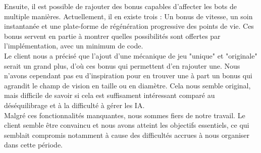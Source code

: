 Ensuite, il est possible de rajouter des bonus capables d'affecter les bots de multiple manières. Actuellement, il en existe trois : Un bonus de vitesse, un soin instantanée et une plate-forme de régénération progressive des points de vie. Ces bonus servent en partie à montrer quelles possibilités sont offertes par l'implémentation, avec un minimum de code.\\

Le client nous a précisé que l'ajout d'une mécanique de jeu "unique" et "originale" serait un grand plus, d'où ces bonus qui permettent d'en rajouter une. Nous n'avons cependant pas eu d'inspiration pour en trouver une à part un bonus qui agrandit le champ de vision en taille ou en diamètre. Cela nous semble original, mais difficile de savoir si cela est suffisament intéressant comparé au déséquilibrage et à la difficulté à gérer les IA.\\

Malgré ces fonctionnalités manquantes, nous sommes fiers de notre travail. Le client semble être convaincu et nous avons atteint les objectifs essentiels, ce qui semblait compromis notamment à cause des difficultés accrues à nous organiser dans cette période.

\newpage
